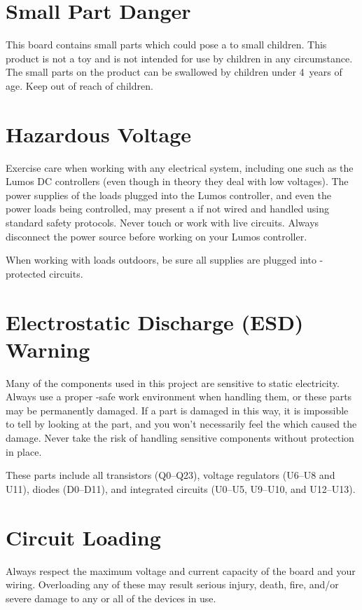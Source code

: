 \documentclass[letterpaper,twoside,onecolumn,openright,final]{memoir}
\begin{document}
\section{Small Part Danger}
This board contains small parts which could pose a  to small children.
This product is not a toy and is not intended for use by children in any circumstance.
The small parts on the product can be swallowed by children under 4~years of age. Keep
out of reach of children.

\section{Hazardous Voltage}
Exercise care when working with any electrical system, including one such as the Lumos DC
controllers (even though in theory they deal with low voltages).  The power supplies of the
loads plugged into the Lumos controller, and even the power loads being controlled, may present
a  if not wired and handled using standard safety protocols.  Never touch or work
with live circuits. Always disconnect the power source before working on your Lumos controller.

When working with loads outdoors, be sure all supplies are plugged into -protected
circuits.

\section{Electrostatic Discharge (ESD) Warning}
Many of the components used in this project are sensitive to static electricity.  Always use a proper
-safe work environment when handling them, or these parts may be permanently damaged.  If
a part is damaged in this way, 
it is impossible to tell by looking at the part, and you won't necessarily
feel the  which caused the damage.  Never take the risk of handling sensitive components
without  protection in place.

These parts include all transistors (Q0--Q23), voltage regulators (U6--U8 and U11), diodes (D0--D11),
and integrated circuits (U0--U5, U9--U10, and U12--U13).

\section{Circuit Loading}
Always respect the maximum voltage and current capacity of the board and your wiring.  Overloading any
of these may result serious injury, death, fire, and/or severe damage to any or all of the devices in use.
\end{document}
